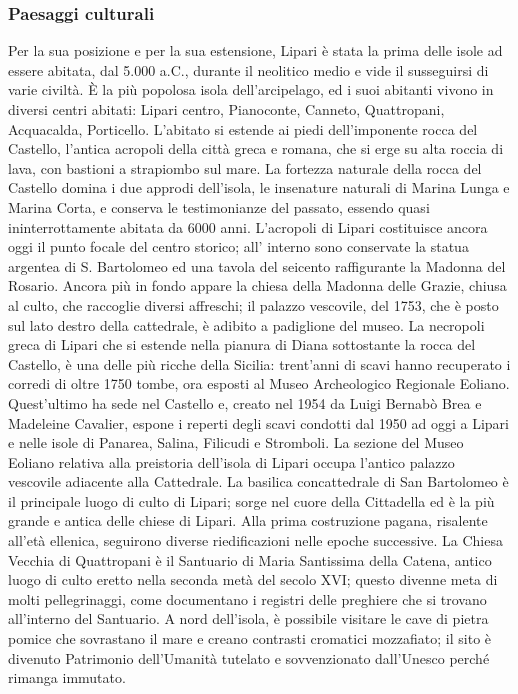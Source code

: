 \documentclass[fleqn,10pt]{SelfArx} %
\begin{document}
\subsubsection{Paesaggi culturali}
Per la sua posizione e per la sua estensione, Lipari è stata la prima delle isole ad essere abitata, dal 5.000 a.C., durante il neolitico medio e vide il susseguirsi di varie civiltà. 
È la più popolosa isola dell'arcipelago, ed i suoi abitanti vivono in diversi centri abitati: Lipari centro, Pianoconte, Canneto, Quattropani, Acquacalda, Porticello.
L'abitato si estende ai piedi dell'imponente rocca del Castello, l'antica acropoli della città greca e romana, che si erge su alta roccia di lava, con bastioni a strapiombo sul mare. 
La fortezza naturale della rocca del Castello domina i due approdi dell'isola, le insenature naturali di Marina Lunga e Marina Corta, e conserva le testimonianze del passato, essendo quasi ininterrottamente abitata da 6000 anni.
L'acropoli di Lipari costituisce ancora oggi il punto focale del centro storico; all' interno sono conservate la statua argentea di S. Bartolomeo ed una tavola del seicento raffigurante la Madonna del Rosario. 
Ancora più in fondo appare la chiesa della Madonna delle Grazie, chiusa al culto, che raccoglie diversi affreschi; il palazzo vescovile, del 1753, che è posto sul lato destro della cattedrale, è adibito a padiglione del museo.
La necropoli greca di Lipari che si estende nella pianura di Diana sottostante la rocca del Castello, è una delle più ricche della Sicilia: trent'anni di scavi hanno recuperato i corredi di oltre 1750 tombe, ora esposti al Museo Archeologico Regionale Eoliano. 
Quest'ultimo ha sede nel Castello e, creato nel 1954 da Luigi Bernabò Brea e Madeleine Cavalier, espone i reperti degli scavi condotti dal 1950 ad oggi a Lipari e nelle isole di Panarea, Salina, Filicudi e Stromboli. 
La sezione del Museo Eoliano relativa alla preistoria dell'isola di Lipari occupa l'antico palazzo vescovile adiacente alla Cattedrale.
La basilica concattedrale di San Bartolomeo è il principale luogo di culto di Lipari; sorge nel cuore della Cittadella ed è la più grande e antica delle chiese di Lipari. 
Alla prima costruzione pagana, risalente all'età ellenica, seguirono diverse riedificazioni nelle epoche successive.
La Chiesa Vecchia di Quattropani è il Santuario di Maria Santissima della Catena, antico luogo di culto eretto nella seconda metà del secolo XVI; questo divenne meta di molti pellegrinaggi, come documentano i registri delle preghiere che si trovano all'interno del Santuario.
A nord dell'isola, è possibile visitare le cave di pietra pomice che sovrastano il mare e creano contrasti cromatici mozzafiato; il sito è divenuto Patrimonio dell'Umanità tutelato e sovvenzionato dall'Unesco perché rimanga immutato.
\end{document}
